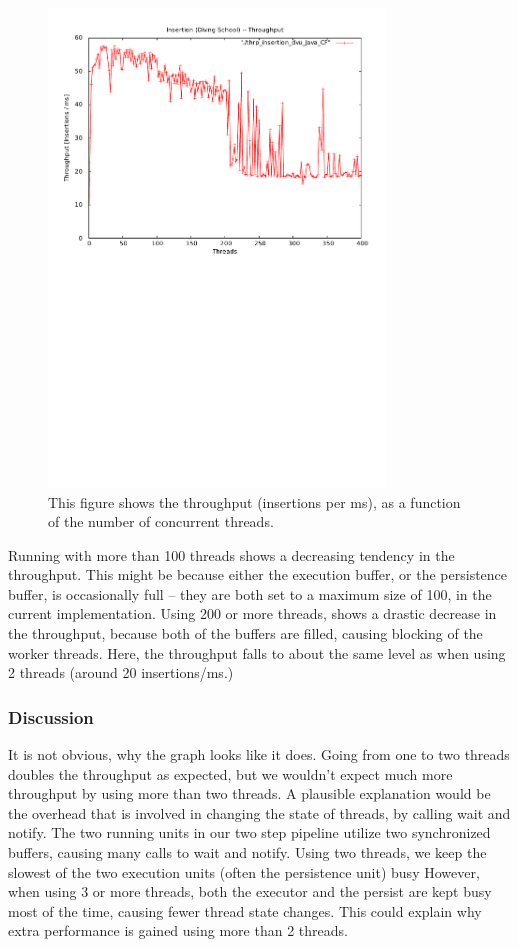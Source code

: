 \begin{figure}[h!]
\centering
\includegraphics[width = 0.8\textwidth, trim = 0 15cm 0 1cm] {img/insertionDvuThroughput.pdf}
\caption{This figure shows the throughput (insertions per ms), as a function of the number of concurrent threads.}
\label{fig:insertionDvuThroughput}
\end{figure}Running with more than 100 threads shows a decreasing tendency in
the throughput. This might be because either the execution buffer,
or the persistence buffer, is occasionally full -- they are both set
to a maximum size of 100, in the current implementation. Using 200
or more threads, shows a drastic decrease in the throughput, because
both of the buffers are filled, causing blocking of the worker threads.
Here, the throughput falls to about the same level as when using 2
threads (around 20 insertions/ms.)


\subsubsection{Discussion}

It is not obvious, why the graph looks like it does. Going from one
to two threads doubles the throughput as expected, but we wouldn't
expect much more throughput by using more than two threads. A plausible
explanation would be the overhead that is involved in changing the
state of threads, by calling wait and notify. The two running units
in our two step pipeline utilize two synchronized buffers, causing
many calls to wait and notify. Using two threads, we keep the slowest
of the two execution units (often the persistence unit) busy However,
when using 3 or more threads, both the executor and the persist are
kept busy most of the time, causing fewer thread state changes. This
could explain why extra performance is gained using more than 2 threads.


